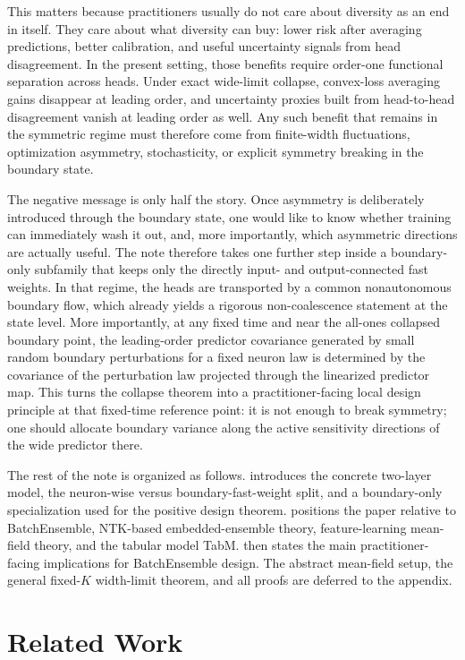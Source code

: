 \documentclass[11pt]{article}
\theoremstyle{definition}
\begin{document}
This matters because practitioners usually do not care about diversity as an
end in itself. They care about what diversity can buy: lower risk after
averaging predictions, better calibration, and useful uncertainty signals from
head disagreement. In the present setting, those benefits require order-one
functional separation across heads. Under exact wide-limit collapse, convex-loss
averaging gains disappear at leading order, and uncertainty proxies built from
head-to-head disagreement vanish at leading order as well. Any such benefit that
remains in the symmetric regime must therefore come from finite-width
fluctuations, optimization asymmetry, stochasticity, or explicit symmetry
breaking in the boundary state.

The negative message is only half the story. Once asymmetry is deliberately
introduced through the boundary state, one would like to know whether training
can immediately wash it out, and, more importantly, which asymmetric directions
are actually useful. The note therefore takes one further step inside a
boundary-only subfamily that keeps only the directly input- and output-connected
fast weights. In that regime, the heads are transported by a common
nonautonomous boundary flow, which already yields a rigorous non-coalescence
statement at the state level. More importantly, at any fixed time and near the
all-ones collapsed boundary point, the leading-order predictor covariance
generated by small random boundary perturbations for a fixed neuron law is
determined by the covariance of the perturbation law projected through the
linearized predictor map. This turns the collapse theorem into a
practitioner-facing local design principle at that fixed-time reference point:
it is not enough to break symmetry; one should allocate boundary variance along
the active sensitivity directions of the wide predictor there.

The rest of the note is organized as follows.  introduces the
concrete two-layer model, the neuron-wise versus boundary-fast-weight split, and
a boundary-only specialization used for the positive design theorem.
 positions the paper relative to BatchEnsemble, NTK-based
embedded-ensemble theory, feature-learning mean-field theory, and the tabular
model TabM.  then states the main practitioner-facing
implications for BatchEnsemble design. The abstract mean-field setup, the
general fixed-$K$ width-limit theorem, and all proofs are deferred to the
appendix.

\section{Related Work}
\label{sec:related}
\end{document}
